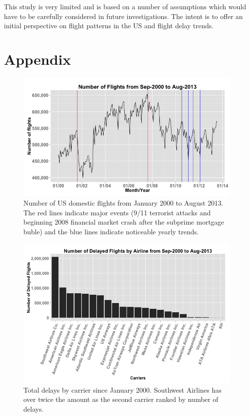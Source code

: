 \documentclass[11pt,twoside,titlepage]{article}
\begin{document}
This study is very limited and is based on a number of assumptions which would have to be carefully considered in future investigations. The intent is to offer an initial perspective on flight patterns in the US and flight delay trends.

\clearpage
\break
\newpage

\section*{Appendix}
\vspace*{4cm}
\begin{figure}[h!]
        \centering
                \includegraphics[width=15cm]{Number_of_Flights1.png}
        \caption{Number of US domestic flights from January 2000 to August 2013. The red lines indicate major events (9/11 terrorist attacks and beginning 2008 financial market crash after the subprime mortgage buble) and the blue lines indicate noticeable yearly trends.}\label{fig:Number of Flights}
\end{figure}


\begin{figure}[h!]
        \centering
                \includegraphics[width=16cm]{Delayed_by_Airline1.png}
        \caption{Total delays by carrier since January 2000. Southwest Airlines has over twice the amount as the second carrier ranked by number of delays.}\label{fig:Delays by Carrier}
\end{figure}
\end{document}
